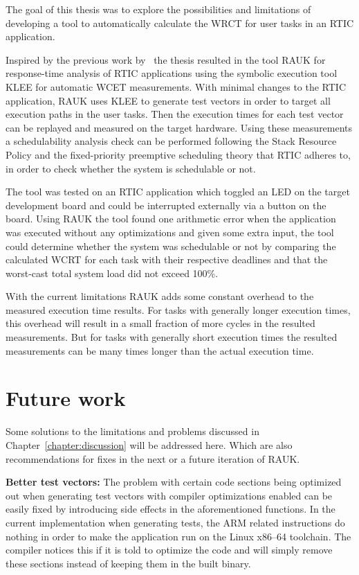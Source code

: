 The goal of this thesis was to explore the possibilities and limitations of
developing a tool to automatically calculate the WRCT for user tasks in an
RTIC application.

Inspired by the previous work by~\cite{lindner} the thesis resulted in the tool
RAUK for response-time analysis of RTIC applications using the symbolic
execution tool KLEE for automatic WCET measurements. With minimal changes to
the RTIC application, RAUK uses KLEE to generate test vectors in order to
target all execution paths in the user tasks. Then the execution times for each
test vector can be replayed and measured on the target hardware. Using these
measurements a schedulability analysis check can be performed following the Stack
Resource Policy and the fixed-priority preemptive scheduling theory that RTIC
adheres to, in order to check whether the system is schedulable or not.

The tool was tested on an RTIC application which toggled an LED on the
target development board and could be interrupted externally via a button
on the board. Using RAUK the tool found one arithmetic error when the
application was executed without any optimizations and given some extra input,
the tool could determine whether the system was schedulable or not by comparing
the calculated WCRT for each task with their respective deadlines and that the
worst-cast total system load did not exceed 100\%.

With the current limitations RAUK adds some constant overhead to the measured
execution time results. For tasks with generally longer execution times, this
overhead will result in a small fraction of more cycles in the resulted
measurements. But for tasks with generally short execution times the resulted
measurements can be many times longer than the actual execution time.

\section{Future work}
Some solutions to the limitations and problems discussed in Chapter~\ref{chapter:discussion} 
will be addressed here. Which are also recommendations for fixes in the next or a future iteration of RAUK\@.

\textbf{Better test vectors:} The problem with certain code sections being
optimized out when generating test vectors with compiler optimizations enabled
can be easily fixed by introducing side effects in the aforementioned
functions. In the current implementation when generating tests, the ARM related
instructions do nothing in order to make the application run on the Linux
x86--64 toolchain. The compiler notices this if it is told to optimize the code
and will simply remove these sections instead of keeping them in the built
binary.

